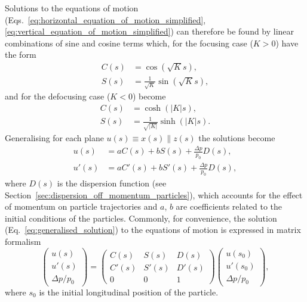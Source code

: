 \documentclass[../main.tex]{subfiles}
\begin{document}
Solutions to the equations of motion (Eqs.~\ref{eq:horizontal_equation_of_motion_simplified}, \ref{eq:vertical_equation_of_motion_simplified}) can therefore be found by linear combinations of sine and cosine terms which, for the focusing case ($K>0$) have the form
\begin{align}
C\left(s\right) &= \cos\left(\sqrt{K}s\right), \nonumber\\
S\left(s\right) &= \frac{1}{\sqrt{K}}\sin\left(\sqrt{K}s\right),
\label{eq:focusing_solution_equation_of_motion}
\end{align}
and for the defocusing case ($K<0$) become
\begin{align}
C\left(s\right) &= \cosh\left(\left|K\right|s\right), \nonumber \\
S\left(s\right) &= \frac{1}{\sqrt{\left|K\right|}}\sinh\left(\left|K\right|s\right).
\label{eq:defocusing_solution_equation_of_motion}    
\end{align}
Generalising for each plane $u\left(s\right)\equiv x\left(s\right) \parallel z\left(s\right)$ the solutions become
\begin{align}
u\left(s\right) &= aC\left(s\right) + bS\left(s\right) + \frac{\Delta p}{p_{0}}D\left(s\right), \nonumber \\
u'\left(s\right) &= aC'\left(s\right) + bS'\left(s\right) + \frac{\Delta p}{p_{0}}D\left(s\right),
\label{eq:generalised_solution}
\end{align}
where $D\left(s\right)$ is the dispersion function (see Section~\ref{sec:dispersion_off_momentum_particles}), which accounts for the effect of momentum on particle trajectories and $a$, $b$ are coefficients related to the initial conditions of the particles. Commonly, for convenience, the solution (Eq.~\ref{eq:generalised_solution}) to the equations of motion is expressed in matrix formalism
\begin{equation}
\begin{pmatrix}
u\left(s\right) \\
u'\left(s\right) \\
\Delta p/p_{0}
\end{pmatrix} = 
\begin{pmatrix}
C\left(s\right) & S\left(s\right) & D\left(s\right) \\
C'\left(s\right) & S'\left(s\right) & D'\left(s\right) \\
0 & 0 & 1
\end{pmatrix}
\begin{pmatrix}
u\left(s_{0}\right) \\
u'\left(s_{0}\right) \\
\Delta p/p_{0}
\end{pmatrix},
\label{eq:general_solution_matrix}    
\end{equation}
where $s_{0}$ is the initial longitudinal position of the particle.
\end{document}
